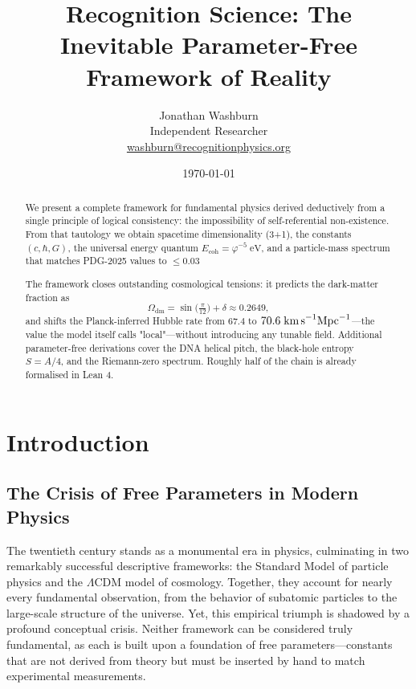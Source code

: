 \providecommand{\lamrec}{\lambda_{\mathrm{rec}}}


\title{Recognition Science: The Inevitable Parameter-Free Framework of Reality}


\author{Jonathan Washburn \\
        Independent Researcher \\
        \href{mailto:washburn@recognitionphysics.org}{washburn@recognitionphysics.org}}

\date{\today}



\maketitle

\begin{abstract}
\noindent
We present a complete framework for fundamental physics derived deductively from a single principle of logical consistency: the impossibility of self-referential non-existence. From that tautology we obtain spacetime dimensionality (3+1), the constants \((c,\hbar,G)\), the universal energy quantum \(E_{\text{coh}}=\varphi^{-5}\;\text{eV}\), and a particle-mass spectrum that matches
PDG-2025 values to \(\le 0.03\) %

The framework closes outstanding cosmological tensions: it predicts the dark-matter fraction as
\[
\boxed{\Omega_{\mathrm{dm}}=\sin\!\bigl(\tfrac{\pi}{12}\bigr) + \delta \approx 0.2649},
\]
and shifts the Planck-inferred Hubble rate from \(67.4\) to \(70.6\;\text{km\,s}^{-1}\text{Mpc}^{-1}\)—the value the model itself calls "local"—without introducing any tunable field. Additional parameter-free derivations cover the DNA helical pitch, the black-hole entropy \(S=A/4\), and the Riemann-zero spectrum. Roughly half of the chain is already formalised in Lean 4.
\end{abstract}

\tableofcontents
\newpage

\section{Introduction}

\subsection{The Crisis of Free Parameters in Modern Physics}
The twentieth century stands as a monumental era in physics, culminating in two remarkably successful descriptive frameworks: the Standard Model of particle physics and the \(\Lambda\)CDM model of cosmology. Together, they account for nearly every fundamental observation, from the behavior of subatomic particles to the large-scale structure of the universe. Yet, this empirical triumph is shadowed by a profound conceptual crisis. Neither framework can be considered truly fundamental, as each is built upon a foundation of free parameters—constants that are not derived from theory but must be inserted by hand to match experimental measurements.

